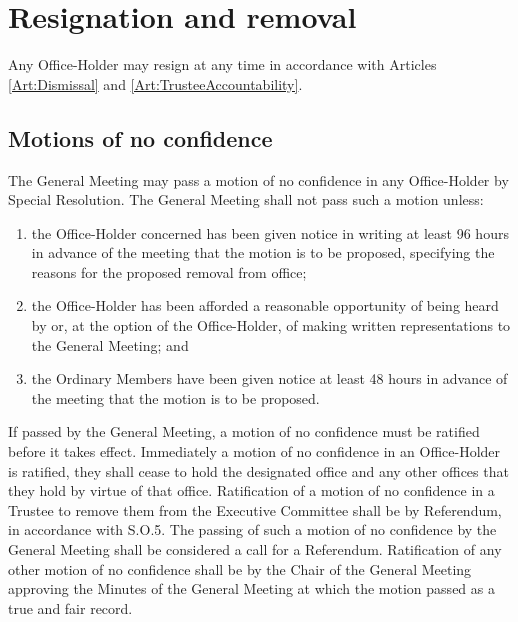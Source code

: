 \section{Resignation and removal}
\npara Any Office-Holder may resign at any time in accordance with Articles \ref{Art:Dismissal} and \ref{Art:TrusteeAccountability}.
\subsection{Motions of no confidence}
\npara The General Meeting may pass a motion of no confidence in any Office-Holder by Special Resolution.  The General Meeting shall not pass such a motion unless:
\begin{enumerate}
	\item the Office-Holder concerned has been given notice in writing at least 96 hours in advance of the meeting that the motion is to be proposed, specifying the reasons for the proposed removal from office;
	\item the Office-Holder has been afforded a reasonable opportunity of being heard by or, at the option of the Office-Holder, of making written representations to the General Meeting; and
	\item the Ordinary Members have been given notice at least 48 hours in advance of the meeting that the motion is to be proposed.
\end{enumerate}
\npara If passed by the General Meeting, a motion of no confidence must be ratified before it takes effect.  Immediately a motion of no confidence in an Office-Holder is ratified, they shall cease to hold the designated office and any other offices that they hold by virtue of that office.
\npara Ratification of a motion of no confidence in a Trustee to remove them from the Executive Committee shall be by Referendum, in accordance with S.O.5.  The passing of such a motion of no confidence by the General Meeting shall be considered a call for a Referendum.
\npara Ratification of any other motion of no confidence shall be by the Chair of the General Meeting approving the Minutes of the General Meeting at which the motion passed as a true and fair record.
